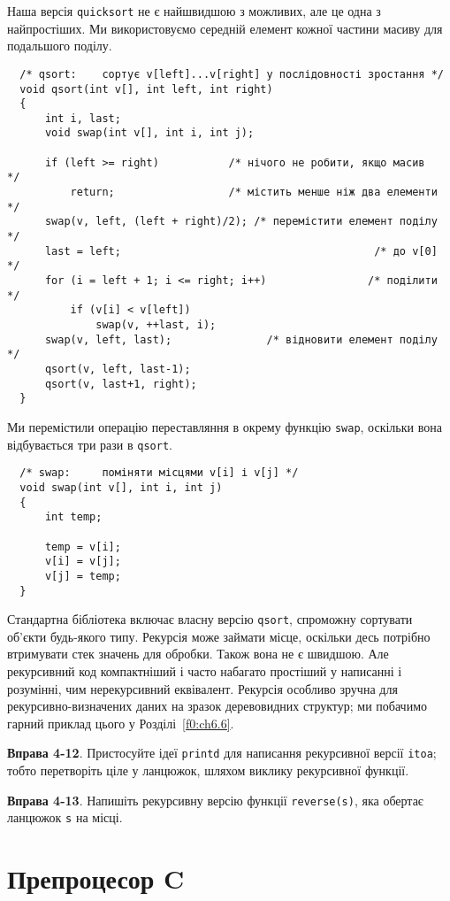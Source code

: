 \documentclass[a4paper,12pt]{book}
\begin{document}
  Наша версія \texttt{quicksort} не є найшвидшою з можливих, але це одна з
  найпростіших. Ми використовуємо середній елемент кожної частини масиву для подальшого
  поділу.

  \begin{verbatim}
  /* qsort:    сортує v[left]...v[right] у послідовності зростання */
  void qsort(int v[], int left, int right)
  {
      int i, last;
      void swap(int v[], int i, int j);

      if (left >= right)           /* нічого не робити, якщо масив   */
          return;                  /* містить менше ніж два елементи */
      swap(v, left, (left + right)/2); /* перемістити елемент поділу */
      last = left;                                        /* до v[0] */
      for (i = left + 1; i <= right; i++)                /* поділити */
          if (v[i] < v[left])
              swap(v, ++last, i);
      swap(v, left, last);               /* відновити елемент поділу */
      qsort(v, left, last-1);
      qsort(v, last+1, right);
  }
  \end{verbatim}

  Ми перемістили операцію переставляння в окрему функцію \texttt{swap}, оскільки вона
  відбувається три рази в \texttt{qsort}.
  \begin{verbatim}
  /* swap:     поміняти місцями v[i] і v[j] */
  void swap(int v[], int i, int j)
  {
      int temp;

      temp = v[i];
      v[i] = v[j];
      v[j] = temp;
  }
  \end{verbatim}

  Стандартна бібліотека включає власну версію \texttt{qsort}, спроможну сортувати об'єкти
  будь-якого типу. Рекурсія може займати місце, оскільки десь потрібно втримувати стек
  значень для обробки. Також вона не є швидшою. Але рекурсивний код компактніший і часто
  набагато простіший у написанні і розумінні, чим нерекурсивний еквівалент. Рекурсія
  особливо зручна для рекурсивно-визначених даних на зразок деревовидних структур; ми
  побачимо гарний приклад цього у Розділі~\ref{f0:ch6.6}.

  \textbf{Вправа 4-12}. Пристосуйте ідеї \texttt{printd} для написання рекурсивної версії
  \texttt{itoa}; тобто перетворіть ціле у ланцюжок, шляхом виклику рекурсивної функції.

  \textbf{Вправа 4-13}. Напишіть рекурсивну версію функції \texttt{reverse(s)}, яка обертає
  ланцюжок \texttt{s} на місці.

\section{Препроцесор C}
\end{document}
